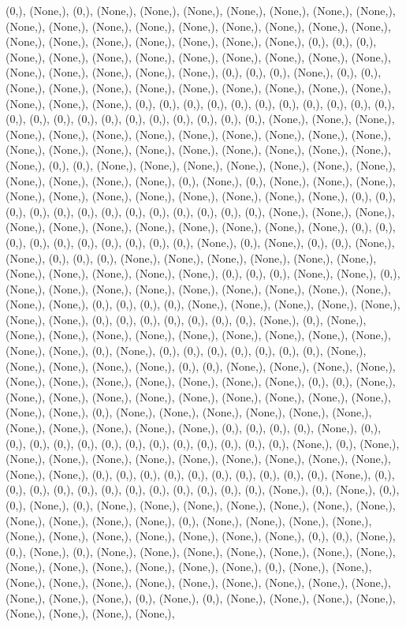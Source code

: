 \documentclass{article}
\begin{document}
(0,), (None,), (0,), (None,), (None,), (None,), (None,), (None,), (None,), (None,), (None,), (None,), (None,), (None,), (None,), (None,), (None,), (None,), (None,), (None,), (None,), (None,), (None,), (None,), (None,), (None,), (0,), (0,), (0,), (None,), (None,), (None,), (None,), (None,), (None,), (None,), (None,), (None,), (None,), (None,), (None,), (None,), (None,), (0,), (0,), (0,), (None,), (0,), (0,), (None,), (None,), (None,), (None,), (None,), (None,), (None,), (None,), (None,), (None,), (None,), (None,), (0,), (0,), (0,), (0,), (0,), (0,), (0,), (0,), (0,), (0,), (0,), (0,), (0,), (0,), (0,), (0,), (0,), (0,), (0,), (0,), (0,), (0,), (None,), (None,), (None,), (None,), (None,), (None,), (None,), (None,), (None,), (None,), (None,), (None,), (None,), (None,), (None,), (None,), (None,), (None,), (None,), (None,), (None,), (None,), (0,), (0,), (None,), (None,), (None,), (None,), (None,), (None,), (None,), (None,), (None,), (None,), (None,), (0,), (None,), (0,), (None,), (None,), (None,), (None,), (None,), (None,), (None,), (None,), (None,), (None,), (None,), (0,), (0,), (0,), (0,), (0,), (0,), (0,), (0,), (0,), (0,), (0,), (0,), (0,), (None,), (None,), (None,), (None,), (None,), (None,), (None,), (None,), (None,), (None,), (None,), (0,), (0,), (0,), (0,), (0,), (0,), (0,), (0,), (0,), (0,), (None,), (0,), (None,), (0,), (0,), (None,), (None,), (0,), (0,), (0,), (None,), (None,), (None,), (None,), (None,), (None,), (None,), (None,), (None,), (None,), (None,), (0,), (0,), (0,), (None,), (None,), (0,), (None,), (None,), (None,), (None,), (None,), (None,), (None,), (None,), (None,), (None,), (None,), (0,), (0,), (0,), (0,), (None,), (None,), (None,), (None,), (None,), (None,), (None,), (0,), (0,), (0,), (0,), (0,), (0,), (0,), (None,), (0,), (None,), (None,), (None,), (None,), (None,), (None,), (None,), (None,), (None,), (None,), (None,), (None,), (0,), (None,), (0,), (0,), (0,), (0,), (0,), (0,), (0,), (None,), (None,), (None,), (None,), (None,), (0,), (0,), (None,), (None,), (None,), (None,), (None,), (None,), (None,), (None,), (None,), (None,), (None,), (0,), (0,), (None,), (None,), (None,), (None,), (None,), (None,), (None,), (None,), (None,), (None,), (None,), (None,), (0,), (None,), (None,), (None,), (None,), (None,), (None,), (None,), (None,), (None,), (None,), (None,), (0,), (0,), (0,), (0,), (None,), (0,), (0,), (0,), (0,), (0,), (0,), (0,), (0,), (0,), (0,), (0,), (0,), (0,), (None,), (0,), (None,), (None,), (None,), (None,), (None,), (None,), (None,), (None,), (None,), (None,), (None,), (None,), (0,), (0,), (0,), (0,), (0,), (0,), (0,), (0,), (0,), (0,), (None,), (0,), (0,), (0,), (0,), (0,), (0,), (0,), (0,), (0,), (0,), (0,), (0,), (None,), (0,), (None,), (0,), (0,), (None,), (0,), (None,), (None,), (None,), (None,), (None,), (None,), (None,), (None,), (None,), (None,), (None,), (0,), (None,), (None,), (None,), (None,), (None,), (None,), (None,), (None,), (None,), (None,), (None,), (0,), (0,), (None,), (0,), (None,), (0,), (None,), (None,), (None,), (None,), (None,), (None,), (None,), (None,), (None,), (None,), (None,), (None,), (None,), (0,), (None,), (None,), (None,), (None,), (None,), (None,), (None,), (None,), (None,), (None,), (None,), (None,), (None,), (None,), (0,), (None,), (0,), (None,), (None,), (None,), (None,), (None,), (None,), (None,), (None,), 
\end{document}
